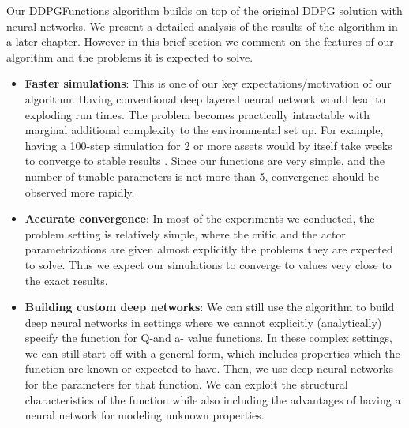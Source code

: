 Our DDPGFunctions algorithm builds on top of the original DDPG solution with neural networks. We present a detailed analysis of the results of the algorithm in a later chapter. \label{chapter:Results} However in this brief section we comment on the features of our algorithm and the problems it is expected to solve.
\begin{itemize}
    \item \textbf{Faster simulations}: This is one of our key expectations/motivation of our algorithm. Having conventional deep layered neural network would lead to exploding run times. The problem becomes practically intractable with marginal additional complexity to the environmental set up. For example, having a 100-step simulation for 2 or more assets would by itself take weeks to converge to stable results \cite{Janik2022}. Since our functions are very simple, and the number of tunable parameters is not more than 5, convergence should be observed more rapidly.
    \item \textbf{Accurate convergence}: In most of the experiments we conducted, the problem setting is relatively simple, where the critic and the actor parametrizations are given almost explicitly the problems they are expected to solve. Thus we expect our simulations to converge to values very close to the exact results. 
    \item \textbf{Building custom deep networks}: We can still use the algorithm to build deep neural networks in settings where we cannot explicitly (analytically) specify the function for Q-and a- value functions. In these complex settings, we can still start off with a general form, which includes properties which the function are known or expected to have.  Then, we use deep neural networks for the parameters for that function. We can exploit the structural characteristics of the function while also including the advantages of having a neural network for modeling unknown properties.
\end{itemize}

\beg



 